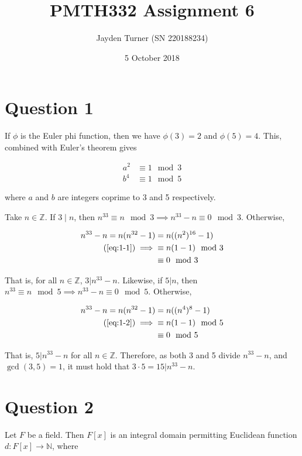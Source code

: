 \documentclass{article}
\title{PMTH332 Assignment 6}
\date{5 October 2018}
\author{Jayden Turner (SN 220188234)}
\begin{document}
\maketitle
{}

\section*{Question 1}

If $\phi$ is the Euler phi function, then we have $\phi(3) = 2$ and
$\phi(5) = 4$. This, combined with Euler's theorem gives

\begin{align}
    a^2 &\equiv 1\mod3 \label{eq:1-1}\\
    b^4 &\equiv 1\mod5 \label{eq:1-2}
\end{align}

where $a$ and $b$ are integers coprime to 3 and 5 respectively.

\hfill \break
Take $n \in \mathbb{Z}$. If $3 \mid n$, then
$n^{33} \equiv n\mod3 \implies n^{33} - n \equiv 0\mod3$. Otherwise,

\begin{align*}
    n^{33} - n = n(n^{32} - 1) &= n((n^2)^{16} - 1)\\
    (\ref{eq:1-1}) \implies &\equiv n(1 - 1)\mod3\\
    &\equiv 0 \mod 3
\end{align*}

That is, for all $n \in \mathbb{Z}$, $3 | n^{33} - n$. Likewise, if
$5 | n$, then $n^{33} \equiv n\mod5 \implies n^{33} - n \equiv 0\mod5$.
Otherwise,

\begin{align*}
    n^{33} - n = n(n^{32} - 1) &= n((n^4)^8 - 1)\\
    (\ref{eq:1-2}) \implies &\equiv n(1 - 1)\mod5\\
    &\equiv 0 \mod 5
\end{align*}

That is, $5 | n^{33} - n$ for all $n \in \mathbb{Z}$. Therefore, as both
3 and 5 divide $n^{33} - n$, and $\gcd(3, 5) = 1$, it must hold that
$3\cdot5 = 15 | n^{33} - n$.

\section*{Question 2}

Let $F$ be a field. Then $F[x]$ is an integral domain permitting Euclidean
function $d: F[x] \to \mathbb{N}$, where
\end{document}
